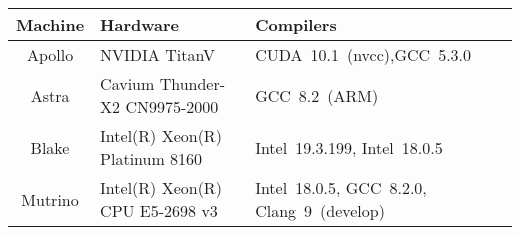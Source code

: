 \renewcommand{\arraystretch}{1.5}
\begin{tabularx}{0.45\textwidth}{|c|>{\raggedright\arraybackslash}X|>{\raggedright\arraybackslash}X|}
\hline
Machine & Hardware & Compilers \\
\hline
    Apollo & NVIDIA TitanV & CUDA~10.1~(nvcc),\newline GCC~5.3.0 \\
Astra & Cavium Thunder-X2 CN9975-2000 & GCC~8.2~(ARM) \\ 
Blake & Intel(R) Xeon(R) Platinum 8160 & Intel~19.3.199, Intel~18.0.5 \\
Mutrino & Intel(R) Xeon(R) CPU E5-2698 v3 & Intel~18.0.5, GCC~8.2.0, Clang~9~(develop) \\
\hline
\end{tabularx}
\renewcommand{\arraystretch}{1.0}

